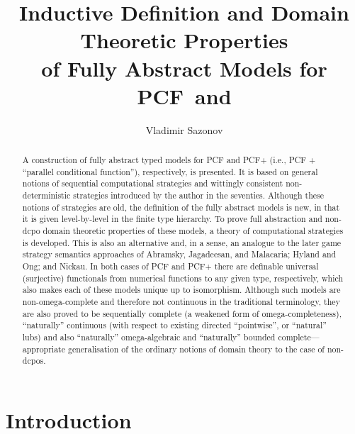 \documentclass[fleqn]{LMCS}
\theoremstyle{plain}\newtheorem{satz}[thm]{Satz}
\theoremstyle{plain}\newtheorem{hyp}[thm]{Hypothesis}
\theoremstyle{plain}\newtheorem{hyps}[thm]{Hypotheses}
\theoremstyle{definition}\newtheorem{note}[thm]{Note}
\newcommand{\PCF}{\mbox{\bf PCF}}
\newcommand{\?}{\mbox{?}}
\begin{document}
\title[Fully Abstract Models for \PCF\ and ]{Inductive Definition and 
Domain Theoretic Properties \\
of 
Fully Abstract Models for \PCF\ and }

\author[V.~Sazonov]{Vladimir Sazonov}	\address{Department of Computer Science, 
the University of Liverpool, 
Liverpool, L69 3BX, U.K.
}	  







\begin{abstract}
A construction of fully abstract typed models 
for PCF and PCF+ 
(i.e., PCF + ``parallel conditional function''), respectively, is presented. 
It is based on general notions of 
sequential computational strategies and wittingly 
consistent 
non-deterministic strategies
introduced by the author 
in the seventies. 
Although these notions of strategies are old, the definition of the 
fully abstract models is new, in that it 
is given level-by-level in the finite type hierarchy. 
To prove full abstraction and non-dcpo 
domain theoretic properties of these models, 
a theory of computational strategies is developed. 
This is also an alternative and, in a sense, an analogue 
to the later game strategy semantics approaches of 
Abramsky, Jagadeesan, and Malacaria; 
Hyland and Ong; and  Nickau. 
In both cases of PCF and PCF+ 
there are definable universal (surjective) 
functionals from numerical functions to any given type, 
respectively, 
which also makes each of these models unique up to isomorphism. 
Although such models are non-omega-complete and therefore 
not continuous in the traditional terminology, 
they are also proved to be 
sequentially complete 
(a weakened form of omega-completeness), 
``naturally'' continuous 
(with respect to existing directed ``pointwise'', or ``natural'' lubs) 
and also 
``naturally'' omega-algebraic and 
``naturally'' bounded complete---appropriate generalisation 
of the ordinary notions 
of domain theory to the case of non-dcpos. 

\end{abstract}
\maketitle

\section{Introduction}\label{sec-intro}
\end{document}
